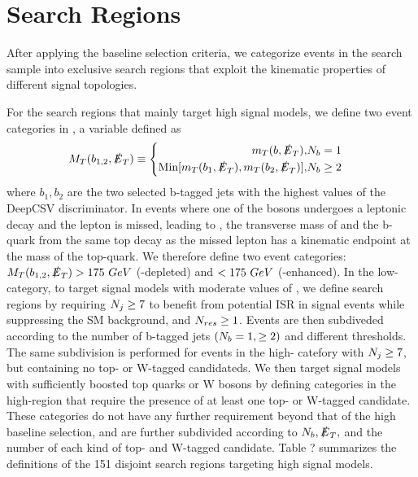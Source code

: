 \section{Search Regions}

After applying the baseline selection criteria, we categorize events in the search sample into exclusive search regions that exploit the kinematic properties of different signal topologies. 

For the search regions that mainly target high \dm{} signal models, we define two event categories in \mtb, a variable defined as
\begin{equation}
M_{T}(b_{1,2},\slashed{E}_{T})\equiv
\begin{cases}
\begin{split}
m_T(b,\slashed{E}_{T}), &N_{b}=1 \\
\text{Min}[m_T(b_1, \slashed{E}_{T}),m_T(b_2,\slashed{E}_{T})], &N_{b}\geq2 \\
\end{split}
\end{cases}
\end{equation}
where $b_1, b_2$ are the two selected b-tagged jets with the highest values of the DeepCSV discriminator. In \ttbar{} events where one of the \W{} bosons undergoes a leptonic decay and the lepton is missed, leading to \met{}, the transverse mass of \met{} and the b-quark from the same top decay as the missed lepton has a kinematic endpoint at the mass of the top-quark. We therefore define two event categories: $M_{T}(b_{1,2},\slashed{E}_{T})>175~GeV$ (\ttbar-depleted) and $< 175~GeV$ (\ttbar-enhanced). In the low-\mtb category, to target signal models with moderate values of \dm, we define search regions by requiring $N_{j}\geq7$ to benefit from potential ISR in signal events while suppressing the SM background, and $N_{res}\geq1$. Events are then subdiveded according to the number of b-tagged jets $(N_{b}=1,\geq2)$ and different \met{} thresholds. The same subdivision is performed for events in the high-\mtb{} catefory with $N_{j}\geq7$, but containing no top- or W-tagged candidateds. We then target signal models with sufficiently boosted top quarks or W bosons by defining categories in the high-\mtb region that require the presence of at least one top- or W-tagged candidate. These categories do not have any further \nj{} requirement beyond that of the high \dm{} baseline selection, and are further subdivided according to $N_{b}, \slashed{E}_{T},$ and the number of each kind of top- and W-tagged candidate. Table ? summarizes the definitions of the 151 disjoint search regions targeting high \dm{} signal models.

